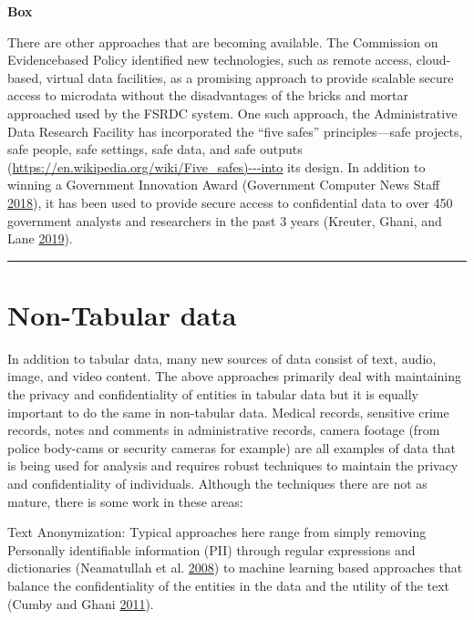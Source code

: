 \documentclass[]{krantz}
\begin{document}
\textbf{Box}

There are other approaches that are becoming available. The Commission
on Evidencebased Policy identified new technologies, such as remote
access, cloud-based, virtual data facilities, as a promising approach to
provide scalable secure access to microdata without the disadvantages of
the bricks and mortar approached used by the FSRDC system. One such
approach, the Administrative Data Research Facility has incorporated the
``five safes'' principles---safe projects, safe people, safe settings,
safe data, and safe outputs
(\url{https://en.wikipedia.org/wiki/Five_safes)---into} its design. In
addition to winning a Government Innovation Award (Government Computer
News Staff
\protect\hyperlink{ref-GovernmentComputerNewsStaff2018}{2018}), it has
been used to provide secure access to confidential data to over 450
government analysts and researchers in the past 3 years (Kreuter, Ghani,
and Lane \protect\hyperlink{ref-Kreuter2019Change}{2019}).

\begin{center}\rule{0.5\linewidth}{\linethickness}\end{center}

\section{Non-Tabular data}\label{non-tabular-data}

In addition to tabular data, many new sources of data consist of text,
audio, image, and video content. The above approaches primarily deal
with maintaining the privacy and confidentiality of entities in tabular
data but it is equally important to do the same in non-tabular data.
Medical records, sensitive crime records, notes and comments in
administrative records, camera footage (from police body-cams or
security cameras for example) are all examples of data that is being
used for analysis and requires robust techniques to maintain the privacy
and confidentiality of individuals. Although the techniques there are
not as mature, there is some work in these areas:

Text Anonymization: Typical approaches here range from simply removing
Personally identifiable information (PII) through regular expressions
and dictionaries (Neamatullah et al.
\protect\hyperlink{ref-Neamatullah2008}{2008}) to machine learning based
approaches that balance the confidentiality of the entities in the data
and the utility of the text (Cumby and Ghani
\protect\hyperlink{ref-Cumby2011}{2011}).
\end{document}
